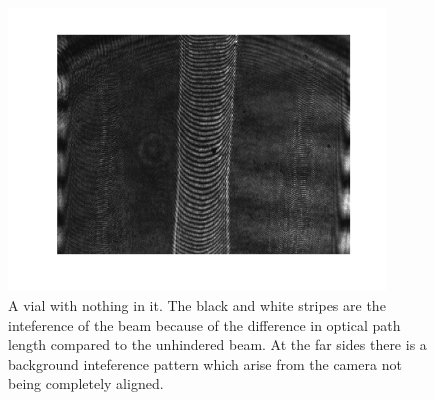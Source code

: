 \begin {figure}[ht!]
\includegraphics [width=10cm]{bilder/sample.png}
\caption {A vial with nothing in it. The black and white stripes are the inteference %
          of the beam because of the difference in optical path length compared to the %
          unhindered beam. At the far sides there is a background inteference pattern %
          which arise from the camera not being completely aligned.}
\label {diffsamp}
\end {figure}

